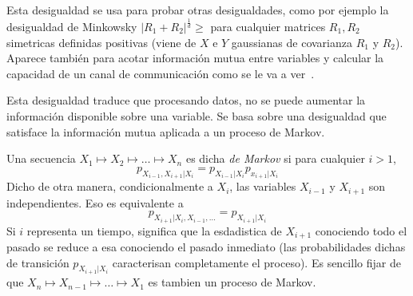 
Esta desigualdad se usa para  probar otras desigualdades, como por ejemplo la
desigualdad de  Minkowsky $|R_1 +  R_2|^{\frac1d} \ge $ para  cualquier matrices
$R_1,  R_2$ simetricas  definidas positivas  (viene de  $X$ e  $Y$  gaussianas de
covarianza $R_1$  y $R_2$).  Aparece  tambi\'en para acotar  informaci\'on mutua
entre variables y  calcular la capacidad de un canal  de communicaci\'on como se
le va a ver~\cite{CovTho06, DemCov91, Rio07, Joh04}.





Esta  desigualdad  traduce  que  procesando  datos,  no  se  puede  aumentar  la
informaci\'on disponible sobre  una variable. Se basa sobre  una desigualdad que
satisface la informaci\'on mutua aplicada a un proceso de Markov.

\begin{definicion}
  Una secuencia  $X_1 \mapsto X_2 \mapsto  \ldots \mapsto X_n$ es  dicha {\it de
    Markov}   si   para  cualquier   $i   >   1$,
  \[
  p_{X_{i-1},X_{i+1}|X_i} = p_{X_{i-1}|X_i} p_{x_{i+1}|X_i}
  \]
  Dicho  de otra  manera, condicionalmente  a $X_i$,  las variables  $X_{i-1}$ y
  $X_{i+1}$       son       independientes.        Eso      es       equivalente
  a
  \[
  p_{X_{i+1}|X_i,X_{i-1},\ldots} = p_{X_{i+1}|X_i}
  \]
  Si  $i$  representa un  tiempo,  significa  que  la esdadistica  de  $X_{i+1}$
  conociendo todo el pasado se reduce  a esa conociendo el pasado inmediato (las
  probabilidades   dichas   de   transici\'on   $p_{X_{i+1}|X_i}$   caracterisan
  completamente  el proceso).   Es sencillo  fijar de  que $X_n  \mapsto X_{n-1}
  \mapsto \ldots \mapsto X_1$ es tambien un proceso de Markov.
\end{definicion}

